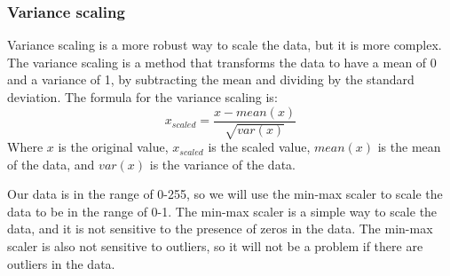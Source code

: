 \subsubsection{Variance scaling}
Variance scaling is a more robust way to scale the data, but it is more complex. The variance scaling is a method that transforms the data to have a mean of 0 and a variance of 1, by subtracting the mean and dividing by the standard deviation. The formula for the variance scaling is:
\begin{equation}
    x_{scaled} = \frac{x - mean(x)}{\sqrt{var(x)}}
\end{equation}
Where $x$ is the original value, $x_{scaled}$ is the scaled value, $mean(x)$ is the mean of the data, and $var(x)$ is the variance of the data. 

Our data is in the range of 0-255, so we will use the min-max scaler to scale the data to be in the range of 0-1. The min-max scaler is a simple way to scale the data, and it is not sensitive to the presence of zeros in the data. The min-max scaler is also not sensitive to outliers, so it will not be a problem if there are outliers in the data. 